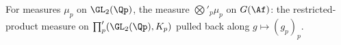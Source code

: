 For measures $\mu_p$ on $\GL_2(\Qp)$, the measure $\bigotimes'_p\mu_p$ on $G(\Af)$: the restricted-product measure on $\prod'_p(\GL_2(\Qp),K_p)$ pulled back along $g\mapsto(g_p)_p$.
